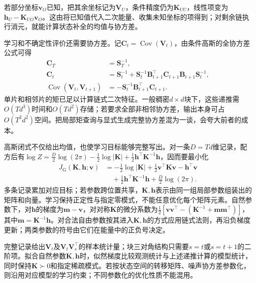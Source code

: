 若部分坐标$\bm v_O$已知，把其余坐标记为$\bm V_U$，条件精度仍为$\bm K_{UU}$，线性项变为$\bm h_U-\bm K_{UO}\bm v_O$。这由将已知值代入二次能量、收集未知坐标的项得到；对剩余链执行消元，就能计算状态补全的均值与协方差。

学习和不确定性评价还需要协方差。记$\bm C_t=\operatorname{Cov}(\bm V_t)$，由条件高斯的全协方差公式可得
\begin{equation}
  \begin{aligned}
    \bm C_T&=\bm S_T^{-1},\\
    \bm C_t&=\bm S_t^{-1}
       +\bm S_t^{-1}\bm B_{t+1}^\top\bm C_{t+1}
                          \bm B_{t+1}\bm S_t^{-1},\\
    \operatorname{Cov}(\bm V_t,\bm V_{t+1})
      &=-\bm S_t^{-1}\bm B_{t+1}^\top\bm C_{t+1}.
  \end{aligned}
  \label{eq:pgm-dynamic-undirected-gaussian-moments}
\end{equation}
单片和相邻片的矩已足以计算链式二次特征。一般稠密$d\times d$块下，这些递推需$O(Td^3)$时间和$O(Td^2)$存储；若要求全部非相邻协方差，输出本身可占$O(T^2d^2)$空间。把局部矩查询与显式生成完整协方差混为一谈，会夸大前者的成本。

高斯闭式不仅给出均值，也使学习目标能够完整写出。对一条$D=Td$维记录，配方后有$\log Z=\tfrac D2\log(2\pi)-\tfrac12\log|\bm K|+\tfrac12\bm h^\top\bm K^{-1}\bm h$，因而要最小化
\begin{equation}
  \begin{aligned}
    J_{\mathrm G}(\bm K,\bm h;\bm v)
      &=-\tfrac12\log|\bm K|+\tfrac12\bm v^\top\bm K\bm v
        -\bm h^\top\bm v\\
      &\quad{}+\tfrac12\bm h^\top\bm K^{-1}\bm h
        +\tfrac D2\log(2\pi).
  \end{aligned}
  \label{eq:pgm-dynamic-undirected-gaussian-objective}
\end{equation}
多条记录累加对应目标；若参数跨位置共享，$\bm K,\bm h$表示由同一组局部参数组装出的矩阵和向量。学习保持正定性与指定零模式，不能任意优化每个矩阵元素。自然参数下，对$\bm h$的梯度为$\bm m-\bm v$，对对称$\bm K$的微分系数为$\tfrac12[\bm v\bm v^\top-(\bm K^{-1}+\bm m\bm m^\top)]$，其中$\bm m=\bm K^{-1}\bm h$。对合法自由参数按其进入$\bm K,\bm h$的方式应用链式法则，再沿负梯度更新；两类参数的符号由它们在能量中的正负号决定。

完整记录给出$\bm V_t$及$\bm V_t\bm V_s^\top$的样本统计量；块三对角结构只需要$s=t$或$s=t+1$的二阶项。拟合自然参数$\bm K,\bm h$时，似然梯度比较观测统计与上述递推计算的模型统计，同时保持$\bm K\succ0$和指定稀疏模式。若按状态空间的转移矩阵、噪声协方差参数化，则沿用对应模型的学习约束；不同参数化的优化性质不能混用。

